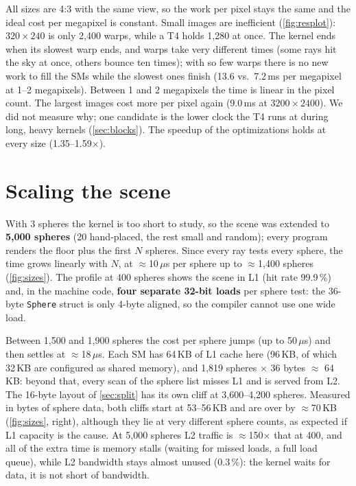 \documentclass[11pt,a4paper]{article}
\begin{document}
All sizes are 4:3 with the same view, so the work per pixel stays the same and the ideal cost per
megapixel is constant. Small images are inefficient (\cref{fig:resplot}): $320 \times 240$ is only
2,400 warps, while a T4 holds 1,280 at once. The kernel ends when its slowest warp ends, and warps
take very different times (some rays hit the sky at once, others bounce ten times); with so few
warps there is no new work to fill the SMs while the slowest ones finish (13.6 vs.\ 7.2\,ms per
megapixel at 1--2 megapixels). Between 1 and 2 megapixels the time is linear in the pixel count. The
largest images cost more per pixel again (9.0\,ms at $3200 \times 2400$). We did not measure why;
one candidate is the lower clock the T4 runs at during long, heavy kernels (\cref{sec:blocks}). The
speedup of the optimizations holds at every size (1.35--1.59$\times$).

\section{Scaling the scene}
\label{sec:scene}

With 3 spheres the kernel is too short to study, so the scene was extended to \textbf{5,000
spheres} (20 hand-placed, the rest small and random); every program renders the floor plus the first
$N$ spheres. Since every ray tests every sphere, the time grows linearly with $N$, at
$\approx$10\,$\mu$s per sphere up to $\approx$1,400 spheres (\cref{fig:sizes}). The profile at 400
spheres shows the scene in L1 (hit rate 99.9\,\%) and, in the machine code, \textbf{four separate
32-bit loads} per sphere test: the 36-byte \texttt{Sphere} struct is only 4-byte aligned, so the
compiler cannot use one wide load.

Between 1,500 and 1,900 spheres the cost per sphere jumps (up to 50\,$\mu$s) and then settles at
$\approx$18\,$\mu$s. Each SM has 64\,KB of L1 cache here (96\,KB, of which 32\,KB are configured
as shared memory), and 1,819 spheres $\times$ 36 bytes $\approx$ 64\,KB: beyond that, every scan of
the sphere list misses L1 and is served from L2. The 16-byte layout of \cref{sec:split} has its
own cliff at 3,600--4,200 spheres. Measured in bytes of sphere data, both cliffs start at
53--56\,KB and are over by $\approx$70\,KB (\cref{fig:sizes}, right), although they lie at very
different sphere counts, as expected if L1 capacity is the cause. At 5,000 spheres L2 traffic is $\approx$150$\times$ that at 400, and all of the extra
time is memory stalls (waiting for missed loads, a full load queue), while L2 bandwidth stays almost
unused (0.3\,\%): the kernel waits for data, it is not short of bandwidth.
\end{document}
